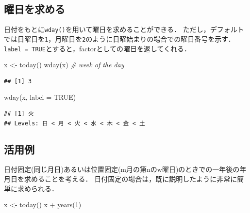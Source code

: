 \documentclass[
]{article}
\newenvironment{Shaded}{\begin{snugshade}}{\end{snugshade}}
\newcommand{\AttributeTok}[1]{\textcolor[rgb]{0.77,0.63,0.00}{#1}}
\newcommand{\CommentTok}[1]{\textcolor[rgb]{0.56,0.35,0.01}{\textit{#1}}}
\newcommand{\ConstantTok}[1]{\textcolor[rgb]{0.00,0.00,0.00}{#1}}
\newcommand{\DecValTok}[1]{\textcolor[rgb]{0.00,0.00,0.81}{#1}}
\newcommand{\FunctionTok}[1]{\textcolor[rgb]{0.00,0.00,0.00}{#1}}
\newcommand{\NormalTok}[1]{#1}
\newcommand{\OtherTok}[1]{\textcolor[rgb]{0.56,0.35,0.01}{#1}}
\newcommand{\SpecialCharTok}[1]{\textcolor[rgb]{0.00,0.00,0.00}{#1}}
\begin{document}
\hypertarget{ux66dcux65e5ux3092ux6c42ux3081ux308b}{%
\subsection{曜日を求める}\label{ux66dcux65e5ux3092ux6c42ux3081ux308b}}

日付をもとに\texttt{wday()}を用いて曜日を求めることができる．
ただし，デフォルトでは日曜日を\texttt{1}，月曜日を\texttt{2}のように日曜始まりの場合での曜日番号を示す．
\texttt{label\ =\ TRUE}とすると，factorとしての曜日を返してくれる．

\begin{Shaded}
\begin{Highlighting}[]
\NormalTok{x }\OtherTok{\textless{}{-}} \FunctionTok{today}\NormalTok{()}
\FunctionTok{wday}\NormalTok{(x) }\CommentTok{\# week of the day}
\end{Highlighting}
\end{Shaded}

\begin{verbatim}
## [1] 3
\end{verbatim}

\begin{Shaded}
\begin{Highlighting}[]
\FunctionTok{wday}\NormalTok{(x, }\AttributeTok{label =} \ConstantTok{TRUE}\NormalTok{)}
\end{Highlighting}
\end{Shaded}

\begin{verbatim}
## [1] 火
## Levels: 日 < 月 < 火 < 水 < 木 < 金 < 土
\end{verbatim}

\hypertarget{ux6d3bux7528ux4f8b-1}{%
\subsection{活用例}\label{ux6d3bux7528ux4f8b-1}}

日付固定(同じ月日)あるいは位置固定(m月の第nのw曜日)のときでの一年後の年月日を求めることを考える．
日付固定の場合は，既に説明したように非常に簡単に求められる．

\begin{Shaded}
\begin{Highlighting}[]
\NormalTok{x }\OtherTok{\textless{}{-}} \FunctionTok{today}\NormalTok{()}
\NormalTok{x }\SpecialCharTok{+} \FunctionTok{years}\NormalTok{(}\DecValTok{1}\NormalTok{)}
\end{Highlighting}
\end{Shaded}
\end{document}
